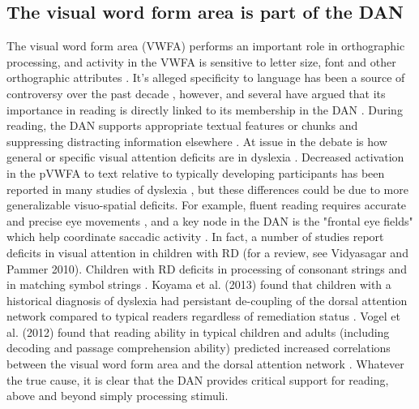 \subsection{The visual word form area is part of the DAN} 
The visual word form area (VWFA) performs an important role in orthographic processing, and activity in the VWFA is sensitive to letter size, font and other orthographic attributes \cite{References from Vogel2011}. It's alleged specificity to language has been a source of controversy over the past decade \cite{...}, however, and several have argued that its importance in reading is directly linked to its membership in the DAN \cite{Vogel2014}. During reading, the DAN supports appropriate textual features or chunks and suppressing distracting information elsewhere \cite{Corbetta2002}. At issue in the debate is how general or specific visual attention deficits are in dyslexia \cite{Vogel2011}. Decreased activation in the pVWFA to text relative to typically developing participants has been reported in many studies of dyslexia \cite{...}, but these differences could be due to more generalizable visuo-spatial deficits. For example, fluent reading requires accurate and precise eye movements \cite{Rayner1998}, and a key node in the DAN is the "frontal eye fields" which help coordinate saccadic activity \cite{Petit1997,Connolly2000}. In fact, a number of studies report deficits in visual attention in children with RD (for a review, see Vidyasagar and Pammer 2010). Children with RD deficits in processing of consonant strings \cite{Pammer2004} and in matching symbol strings \cite{LassusSangosse2008}. Koyama et al. (2013) found that children with a historical diagnosis of dyslexia had persistant de-coupling of the dorsal attention network compared to typical readers regardless of remediation status \cite{Koyama2013}. Vogel et al. (2012) found that reading ability in typical children and adults (including decoding and passage comprehension ability) predicted increased correlations between the visual word form area and the dorsal attention network \cite{Vogel2012}. Whatever the true cause, it is clear that the DAN provides critical support for reading, above and beyond simply processing stimuli.

